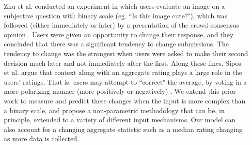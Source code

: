 Zhu et al. conducted an experiment in which users evaluate an image on a subjective question with binary scale (eg. ``Is this image cute?"), which was followed (either immediately or later) by a presentation of the crowd consensus opinion \cite{zhu2012switch}. 
Users were given an opportunity to change their response, and they concluded that there was a significant tendency to change submissions.
The tendency to change was the strongest when users were asked to make their second decision much later and not immediately after the first.
Along these lines, Sipos et al. argue that context along with an aggregate rating plays a large role in the users' ratings. That is, users may attempt to ``correct" the average, by voting in a more polarizing manner (more positively or negatively) \cite{siposreview}.
We extend this prior work to measure and predict these changes when the input is more complex than a binary scale, and propose a non-parametric methodology that can be, in principle, extended to a variety of different input mechanisms.
Our model can also account for a changing aggregate statistic such as a median rating changing as more data is collected. 








